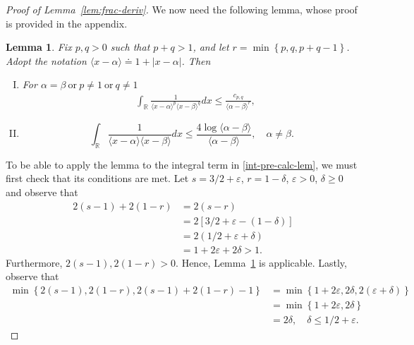 \documentclass[12pt,reqno]{amsart}
\numberwithin{equation}{section}  %
\numberwithin{figure}{section}
\newcommand{\rr}{\mathbb{R}}
\newcommand{\ee}{\varepsilon}
\newtheorem{lemma}[theorem]{Lemma}
\begin{document}
\begin{proof}[Proof of Lemma~\ref{lem:frac-deriv}]
%
%
We now need the following lemma, whose proof is provided in the appendix.
%
%
\begin{lemma}
	\label{lem:calc}
 Fix $p, q > 0$ such that $p +q >1$, and let $r =\min\left\{p, q, p+q-1
 \right\}$. Adopt the notation
 $\langle x - \alpha \rangle  \doteq 1 + | x - \alpha |$. Then 
 \begin{enumerate}[(I)]
   \item
For $\alpha=\beta \ \text{or} \ p \neq 1 \ \text{or} \ q \neq 1$
 \begin{equation*}
\begin{split}
  & \int_{\rr} \frac{1}{\langle x - \alpha \rangle ^{p} \langle x -
  \beta \rangle
  ^{q}} d x
  \le \frac{c_{p,q}}{\langle \alpha - \beta \rangle ^{r}}, 
  \end{split}
\end{equation*}
  \item
    \begin{equation*}
  \int_{\rr} \frac{1}{\langle x - \alpha \rangle  \langle x - \beta
  \rangle} d x
  \le  \frac{4 \log \langle \alpha - \beta \rangle}{\langle \alpha - \beta
  \rangle}, \quad \alpha \neq \beta.
\end{equation*}
\end{enumerate}
\end{lemma}
To be able to apply the lemma to the integral term in \eqref{int-pre-calc-lem}, 
we must first check
that its conditions are met. Let $ s = 3/2 + \ee$, $r = 1- \delta$, $\ee > 0$, $
\delta \ge 0$ and observe that
%
%
\begin{equation*}
\begin{split}
2(s-1) + 2(1-r)
& = 2(s-r)
\\
& = 2[3/2 + \ee - (1 - \delta)]
\\
& = 2(1/2 + \ee + \delta)
\\
& = 1 + 2 \ee + 2 \delta > 1.
\end{split}
\end{equation*}
%
%
Furthermore, $2(s-1), 2(1-r) > 0$. Hence, Lemma~\ref{lem:calc} is applicable. 
Lastly, observe that 
%
%
\begin{equation*}
\begin{split}
  \min\left\{ 2(s-1), 2(1-r), 2(s-1) + 2(1-r) -1 \right\}
  & = \min\left\{ 1 + 2 \ee, 2 \delta, 2(\ee + \delta) \right\}
  \\
  & = \min\left\{ 1 + 2 \ee, 2 \delta\right\}
  \\
  & = 2 \delta, \quad \delta \le 1/2 + \ee.
\end{split}

\end{equation*}
\end{proof}
\end{document}
